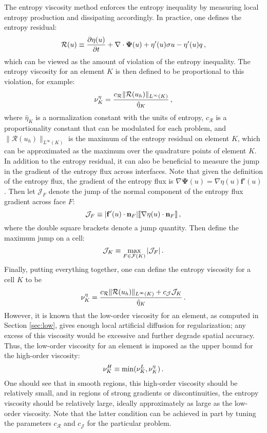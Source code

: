 The entropy viscosity method enforces the entropy inequality by measuring
local entropy production and dissipating accordingly. In practice, one
defines the entropy residual:
\begin{equation}
  \mathcal{R}(u) \equiv \frac{\partial \eta(u)}{\partial t} + \nabla\cdot\mathbf{\Psi}(u)
    + \eta'(u)\sigma u - \eta'(u)q \,,
\end{equation}
which can be viewed as the amount of violation of the entropy inequality.
The entropy viscosity for an element $K$ is then defined to be proportional
to this violation, for example:
\begin{equation}
  \nu^\eta_K = \frac{c_\mathcal{R}\|\mathcal{R}(u_h)\|_{L^\infty(K)}}
    {\hat{\eta}_K}
    \,,
\end{equation}
where $\hat{\eta}_K$ is a normalization constant with the units of entropy,
$c_\mathcal{R}$ is a proportionality constant that can be modulated for
each problem, and $\|\mathcal{R}(u_h)\|_{L^\infty(K)}$ is the maximum of the
entropy residual on element $K$, which can be approximated as the maximum over
the quadrature points of element $K$. In addition to the entropy residual, it can
also be beneficial to measure the jump in the gradient of the entropy flux
across interfaces.
Note that given the definition of the entropy flux, the gradient of the entropy
flux is $\nabla\mathbf{\Psi}(u)=\nabla\eta(u)\mathbf{f}'(u)$. Then let
$\mathcal{J}_F$ denote the jump of the normal component of the entropy flux
gradient across face $F$:
\begin{equation}
  \mathcal{J}_F \equiv |\mathbf{f}'(u)\cdot\mathbf{n}_F|
    [\![\nabla\eta(u)\cdot\mathbf{n}_F]\!] \,,
\end{equation}
where the double square brackets denote a jump quantity. Then define the
maximum jump on a cell:
\begin{equation}
  \mathcal{J}_K \equiv \max\limits_{F\in\mathcal{F}(K)} |\mathcal{J}_F| \,.
\end{equation}
Finally, putting everything together, one can define the entropy viscosity
for a cell $K$ to be
\begin{equation}
  \nu^\eta_K = \frac{c_\mathcal{R}\|\mathcal{R}(u_h)\|_{L^\infty(K)}
    + c_\mathcal{J}\mathcal{J}_K}{\hat{\eta}_K}
    \,.
\end{equation}
However, it is known that the low-order viscosity for an element, as computed
in Section \ref{sec:low}, gives enough local artificial diffusion for
regularization; any excess of this viscosity would be excessive and further
degrade spatial accuracy. Thus, the low-order viscosity for an element is
imposed as the upper bound for the high-order viscosity:
\begin{equation}
  \nu^H_K \equiv \min(\nu^L_K, \nu^\eta_K) \,.
\end{equation}
One should see that in smooth regions, this high-order viscosity should be
relatively small, and in regions of strong gradients or discontinuities,
the entropy viscosity should be relatively large, ideally approximately
as large as the low-order viscosity. Note that the latter condition can
be achieved in part by tuning the parameters
$c_\mathcal{R}$ and $c_\mathcal{J}$ for the particular problem.

